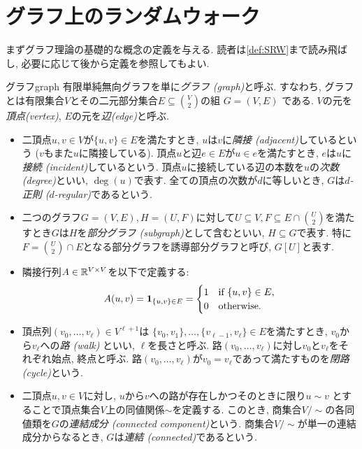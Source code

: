 \section{グラフ上のランダムウォーク}
まずグラフ理論の基礎的な概念の定義を与える.
読者は\cref{def:SRW}まで読み飛ばし, 必要に応じて後から定義を参照してもよい.
%
\begin{definition}{グラフ}{graph}
  有限単純無向グラフを単に\emph{グラフ (graph)}と呼ぶ.
  すなわち, グラフとは有限集合$V$とその二元部分集合$E\subseteq \binom{V}{2}$の組 $G = (V, E)$ である.
  $V$の元を\emph{頂点(vertex)}, $E$の元を\emph{辺(edge)}と呼ぶ.
  \begin{itemize}
    \item 二頂点$u,v\in V$が$\{u,v\}\in E$を満たすとき, $u$は$v$に\emph{隣接 (adjacent)}しているという ($v$もまた$u$に隣接している).
          頂点$u$と辺$e\in E$が$u\in e$を満たすとき, $e$は$u$に\emph{接続 (incident)}しているという.
          頂点$u$に接続している辺の本数を$u$の\emph{次数(degree)}といい, $\deg(u)$で表す.
          全ての頂点の次数が$d$に等しいとき, $G$は\emph{$d$-正則 ($d$-regular)}であるという.
    \item 二つのグラフ$G=(V,E),H=(U,F)$に対して$U\subseteq V,F\subseteq E \cap \binom{U}{2}$を満たすとき$G$は$H$を\emph{部分グラフ (subgraph)}として含むといい, $H\subseteq G$で表す.
    特に$F=\binom{U}{2}\cap E$となる部分グラフを誘導部分グラフと呼び, $G[U]$と表す.
    \item 隣接行列$A \in \mathbb{R}^{V\times V}$を以下で定義する:
          \[
            A(u,v) = \mathbf{1}_{\{u,v\}\in E} =
            \begin{cases}
              1 & \text{if }\{u,v\}\in E, \\
              0 & \text{otherwise}.
            \end{cases}
          \]
    \item 頂点列$(v_0,\dots,v_\ell) \in V^{\ell+1}$は
          $\{v_0,v_1\},\dots,\{v_{\ell-1},v_\ell\}\in E$を満たすとき,
          $v_0$から$v_\ell$への\emph{路 (walk)} といい, $\ell$を長さと呼ぶ.
          路$(v_0,\dots,v_\ell)$に対し$v_0$と$v_\ell$をそれぞれ始点, 終点と呼ぶ.
          路$(v_0,\dots,v_\ell)$が$v_0=v_\ell$であって満たすものを\emph{閉路 (cycle)}という.
    \item  二頂点$u,v \in V$に対し,
          $u$から$v$への路が存在しかつそのときに限り$u\sim v$
          とすることで頂点集合$V$上の同値関係$\sim$を定義する.
          このとき, 商集合$V / \sim$の各同値類を$G$の\emph{連結成分 (connected component)}という.
          商集合$V / \sim$が単一の連結成分からなるとき, $G$は\emph{連結 (connected)}であるという.

\end{itemize}
\end{definition}
